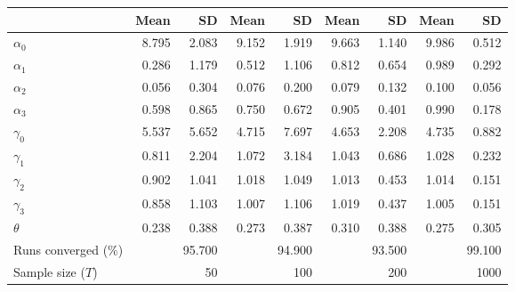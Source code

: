 
\begin{tabular}[t]{lrrrrrrrr}
\toprule
  & Mean & SD & Mean  & SD  & Mean   & SD   & Mean    & SD   \\
\midrule
$\alpha_{0}$ & 8.795 & 2.083 & 9.152 & 1.919 & 9.663 & 1.140 & 9.986 & 0.512\\
$\alpha_{1}$ & 0.286 & 1.179 & 0.512 & 1.106 & 0.812 & 0.654 & 0.989 & 0.292\\
$\alpha_{2}$ & 0.056 & 0.304 & 0.076 & 0.200 & 0.079 & 0.132 & 0.100 & 0.056\\
$\alpha_{3}$ & 0.598 & 0.865 & 0.750 & 0.672 & 0.905 & 0.401 & 0.990 & 0.178\\
$\gamma_{0}$ & 5.537 & 5.652 & 4.715 & 7.697 & 4.653 & 2.208 & 4.735 & 0.882\\
$\gamma_{1}$ & 0.811 & 2.204 & 1.072 & 3.184 & 1.043 & 0.686 & 1.028 & 0.232\\
$\gamma_{2}$ & 0.902 & 1.041 & 1.018 & 1.049 & 1.013 & 0.453 & 1.014 & 0.151\\
$\gamma_{3}$ & 0.858 & 1.103 & 1.007 & 1.106 & 1.019 & 0.437 & 1.005 & 0.151\\
$\theta$ & 0.238 & 0.388 & 0.273 & 0.387 & 0.310 & 0.388 & 0.275 & 0.305\\
Runs converged (\%) &  & 95.700 &  & 94.900 &  & 93.500 &  & 99.100\\
Sample size ($T$) &  & 50 &  & 100 &  & 200 &  & 1000\\
\bottomrule
\end{tabular}

